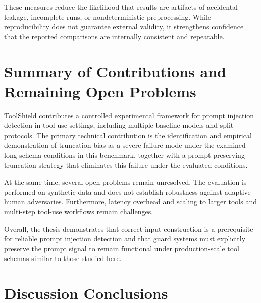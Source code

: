 These measures reduce the likelihood that results are artifacts of accidental leakage, incomplete runs, or nondeterministic preprocessing. While reproducibility does not guarantee external validity, it strengthens confidence that the reported comparisons are internally consistent and repeatable.

\section{Summary of Contributions and Remaining Open Problems}
\label{subsec:discussion_contributions}

ToolShield contributes a controlled experimental framework for prompt injection detection in tool-use settings, including multiple baseline models and split protocols. The primary technical contribution is the identification and empirical demonstration of truncation bias as a severe failure mode under the examined long-schema conditions in this benchmark, together with a prompt-preserving truncation strategy that eliminates this failure under the evaluated conditions.

At the same time, several open problems remain unresolved. The evaluation is performed on synthetic data and does not establish robustness against adaptive human adversaries. Furthermore, latency overhead and scaling to larger tools and multi-step tool-use workflows remain challenges.

Overall, the thesis demonstrates that correct input construction is a prerequisite for reliable prompt injection detection and that guard systems must explicitly preserve the prompt signal to remain functional under production-scale tool schemas similar to those studied here.

\section{Discussion Conclusions}
\label{subsec:discussion_conclusions}

